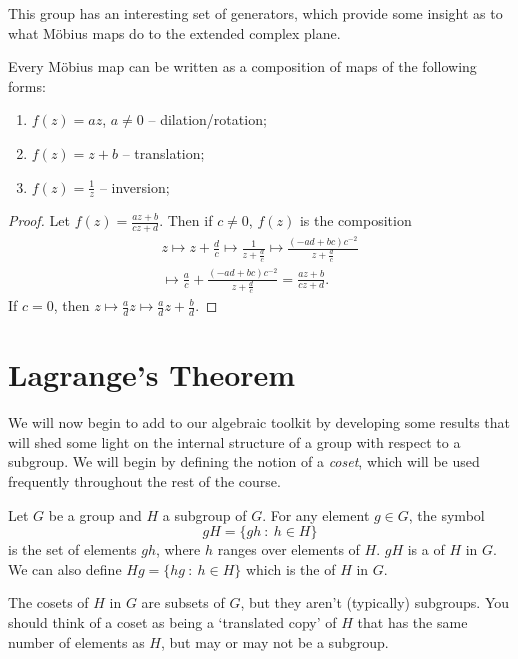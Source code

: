 \documentclass[a4paper]{scrartcl}
\begin{document}
This group has an interesting set of generators, which provide some insight as to what Möbius maps do to the extended complex plane.

\begin{theorem}
	Every Möbius map can be written as a composition of maps of the following forms:
	\begin{enumerate}
		\item $f(z) = az$, $a \neq 0$ -- dilation/rotation;
		\item $f(z) = z + b$ -- translation;
		\item $f(z) = \frac{1}{z}$ -- inversion;
	\end{enumerate}
\end{theorem}
\begin{proof}
	Let $f(z) = \frac{az + b}{cz + d}$. Then if $c \neq 0$, $f(z)$ is the composition
	\begin{align*}
		z \longmapsto z + \frac{d}{c} \longmapsto \frac{1}{z + \frac{d}{c}} \longmapsto \frac{(-ad + bc)c^{-2}}{z + \frac{d}{c}} \\
		\longmapsto \frac{a}{c} + \frac{(-ad + bc)c^{-2}}{z + \frac{d}{c}} = \frac{az + b}{cz + d}.
	\end{align*}
	If $c = 0$, then $z \mapsto \frac{a}{d}z \mapsto \frac{a}{d}z + \frac{b}{d}$. 
\end{proof}

\section{Lagrange's Theorem}

We will now begin to add to our algebraic toolkit by developing some results that will shed some light on the internal structure of a group with respect to a subgroup. We will begin by defining the notion of a \emph{coset}, which will be used frequently throughout the rest of the course.

\begin{definition}[Coset]
	Let $G$ be a group and $H$ a subgroup of $G$. For any element $g \in G$, the symbol
	$$
	gH = \{gh \ : \ h \in H\}
	$$
	is the set of elements $gh$, where $h$ ranges over elements of $H$. $gH$ is a  of $H$ in $G$. We can also define $Hg = \{hg \ :\ h \in H\}$ which is the  of $H$ in $G$.
\end{definition}

The cosets of $H$ in $G$ are subsets of $G$, but they aren't (typically) subgroups. You should think of a coset as being a `translated copy' of $H$ that has the same number of elements as $H$, but may or may not be a subgroup.
\end{document}
